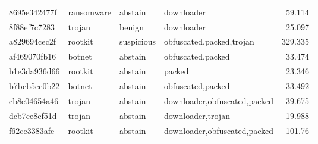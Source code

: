 \begin{table}[htbp]
\begin{tabular}{l l l l r}
            8695e342477f         & ransomware               & abstain                  & downloader                          & 59.114                           \\
            8f88ef7c7283         & trojan                   & benign                   & downloader                          & 25.097                           \\
            a829694cec2f         & rootkit                  & suspicious               & obfuscated,packed,trojan            & 329.335                          \\
            af469070fb16         & botnet                   & abstain                  & obfuscated,packed                   & 33.474                           \\
            b1e3da936d66         & rootkit                  & abstain                  & packed                              & 23.346                           \\
            b7bcb5ec0b22         & botnet                   & abstain                  & obfuscated,packed                   & 33.492                           \\
            cb8e04654a46         & trojan                   & abstain                  & downloader,obfuscated,packed        & 39.675                           \\
            dcb7ce8cf51d         & trojan                   & abstain                  & downloader,trojan                   & 19.988                           \\
            f62ce3383afe         & rootkit                  & abstain                  & downloader,obfuscated,packed        & 101.76                           \\
            \hline
      \end{tabular}
\end{table}

